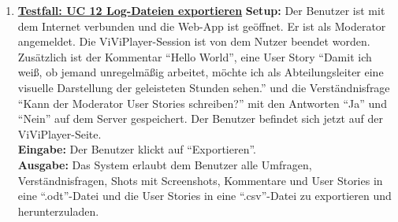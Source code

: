 \begin{enumerate}
	\item \underline{\textbf{Testfall: UC 12 Log-Dateien exportieren}} \linebreak
	\textbf{Setup:} Der Benutzer ist mit dem Internet verbunden und die Web-App ist geöffnet. Er ist als Moderator angemeldet. Die ViViPlayer-Session ist von dem Nutzer beendet worden. Zusätzlich ist der Kommentar ``Hello World'', eine User Story ``Damit ich weiß, ob jemand unregelmäßig arbeitet, möchte ich als Abteilungsleiter eine visuelle Darstellung der geleisteten Stunden sehen.'' und die Verständnisfrage ``Kann der Moderator User Stories schreiben?'' mit den Antworten ``Ja'' und ``Nein'' auf dem Server gespeichert. Der Benutzer befindet sich jetzt auf der ViViPlayer-Seite. \\
	\textbf{Eingabe:} Der Benutzer klickt auf ``Exportieren''. \\
	\textbf{Ausgabe:} Das System erlaubt dem Benutzer alle Umfragen, Verständnisfragen, Shots mit Screenshots, Kommentare und User Stories in eine ``.odt''-Datei und die User Stories in eine ``.csv''-Datei zu exportieren und herunterzuladen.\\ 
	
\end{enumerate}
